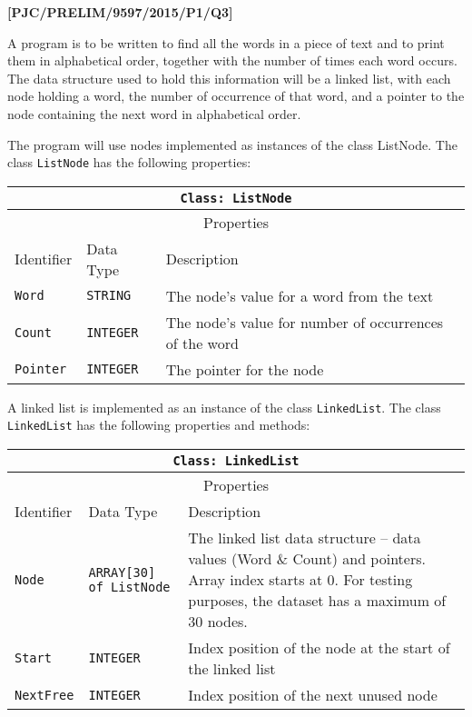 \item \textbf{{[}PJC/PRELIM/9597/2015/P1/Q3{]} }

A program is to be written to find all the words in a piece of text
and to print them in alphabetical order, together with the number
of times each word occurs. The data structure used to hold this information
will be a linked list, with each node holding a word, the number of
occurrence of that word, and a pointer to the node containing the
next word in alphabetical order. 

The program will use nodes implemented as instances of the class ListNode.
The class \texttt{ListNode} has the following properties: 
\noindent \begin{center}
\begin{tabular}{|l|l|l|}
\hline 
\multicolumn{3}{|c|}{\texttt{Class: ListNode}}\tabularnewline
\hline 
\multicolumn{3}{|c|}{Properties}\tabularnewline
\hline 
\texttt{\hspace{0.01\columnwidth}}Identifier & \texttt{\hspace{0.01\columnwidth}}Data Type & \texttt{\hspace{0.05\columnwidth}}Description\tabularnewline
\hline 
\texttt{Word} & \texttt{STRING} & The node\textquoteright s value for a word from the text \tabularnewline
\hline 
\texttt{Count} & \texttt{INTEGER} & The node's value for number of occurrences of the word\tabularnewline
\hline 
\texttt{Pointer} & \texttt{INTEGER} & The pointer for the node\tabularnewline
\hline 
\end{tabular}
\par\end{center}

A linked list is implemented as an instance of the class \texttt{LinkedList}.
The class \texttt{LinkedList} has the following properties and methods: 
\noindent \begin{center}
\begin{tabular}{|l|l|l|}
\hline 
\multicolumn{3}{|c|}{\texttt{Class: LinkedList}}\tabularnewline
\hline 
\multicolumn{3}{|c|}{Properties}\tabularnewline
\hline 
\texttt{\hspace{0.01\columnwidth}}Identifier & \texttt{\hspace{0.01\columnwidth}}Data Type & \texttt{\hspace{0.05\columnwidth}}Description\tabularnewline
\hline 
\texttt{Node} & \texttt{ARRAY{[}30{]} of ListNode} & The linked list data structure -- data values (Word \& Count) and
pointers. Array index starts at 0. For testing purposes, the dataset
has a maximum of 30 nodes. \tabularnewline
\hline 
\texttt{Start} & \texttt{INTEGER} & Index position of the node at the start of the linked list\tabularnewline
\hline 
\texttt{NextFree} & \texttt{INTEGER} & Index position of the next unused node\tabularnewline
\hline 
\end{tabular}
\par\end{center}

